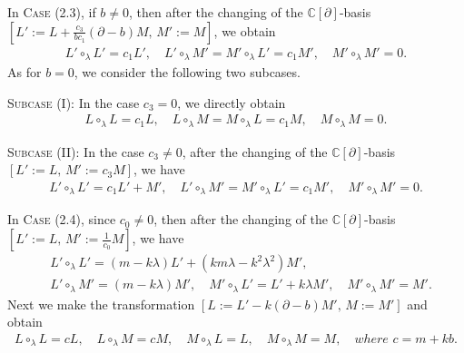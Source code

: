 \documentclass[11pt,letterpaper,reqno]{amsart}
\theoremstyle{definition}
\numberwithin{equation}{section}
\begin{document}
In C\textsc{ase} (2.3), if $b\neq0$, then after the changing of the $\mathbb{C}[\partial]$-basis $[L':=L+\frac{c_3}{bc_1}(\partial-b)M,\, M':= M]$, we obtain
\begin{align*}
L'\circ_\lambda L'=c_1L',\quad L'\circ_\lambda M'=M'\circ_\lambda L'=c_1M',\quad M'\circ_\lambda M'=0.
\end{align*}
As for $b=0$, we consider the following two subcases.

S\textsc{ubcase} (I): In the case $c_{3}=0$, we directly obtain
\begin{align*}
L\circ_\lambda L=c_1L,\quad L\circ_\lambda M=M\circ_\lambda L=c_1M,\quad M\circ_\lambda M=0.
\end{align*}

S\textsc{ubcase} (II): In the case $c_{3}\neq0$, after the changing of the $\mathbb{C}[\partial]$-basis $[L':=L,\, M':= c_3M]$, we have
\begin{align*}
L'\circ_\lambda L'=c_1L'+M',\quad L'\circ_\lambda M'=M'\circ_\lambda L'=c_1M',\quad M'\circ_\lambda M'=0.
\end{align*}

In C\textsc{ase} (2.4), since $c_0\neq0$, then after the changing of the $\mathbb{C}[\partial]$-basis $[L':=L,\, M':=\frac{1}{c_0} M]$, we have
\begin{align*}
&L'\circ_\lambda L'= (m-k\lambda)L'+(km\lambda-{k^2}\lambda^2)M',\\
&L'\circ_\lambda M'=(m-k\lambda)M',\quad M'\circ_\lambda L'=L'+k\lambda M', \quad M'\circ_\lambda M'=M'.
\end{align*}
Next we make the transformation $[L:=L'-k(\partial-b)M',\, M:= M']$ and obtain
\begin{align*}
L\circ_\lambda L=c L,\quad L\circ_\lambda M=c M,\quad M\circ_\lambda L=L,\quad M\circ_\lambda M=M,\quad where\,\, c=m+kb.
\end{align*}
\end{document}

